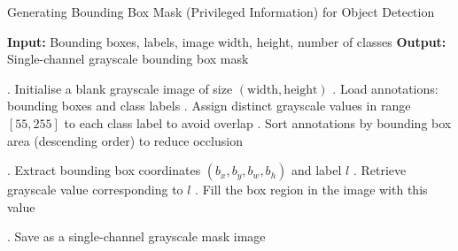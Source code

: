         
        
\begin{algorithm}
    \caption{Generating Bounding Box Mask (Privileged Information) for Object Detection}
    \label{alg:boundingBoxMask}
    \begin{algorithmic}
        \State \textbf{Input:} Bounding boxes, labels, image width, height, number of classes
        \State \textbf{Output:} Single-channel grayscale bounding box mask
        
        . Initialise a blank grayscale image of size \( (\text{width}, \text{height}) \)
        . Load annotations: bounding boxes and class labels
        . Assign distinct grayscale values in range $[55, 255]$ to each class label to avoid overlap
        . Sort annotations by bounding box area (descending order) to reduce occlusion
        
            . Extract bounding box coordinates \( (b_x, b_y, b_w, b_h) \) and label \( l \)
            . Retrieve grayscale value corresponding to \( l \)
            . Fill the box region in the image with this value
        \EndFor
        
        . Save as a single-channel grayscale mask image
    \end{algorithmic}
\end{algorithm}

